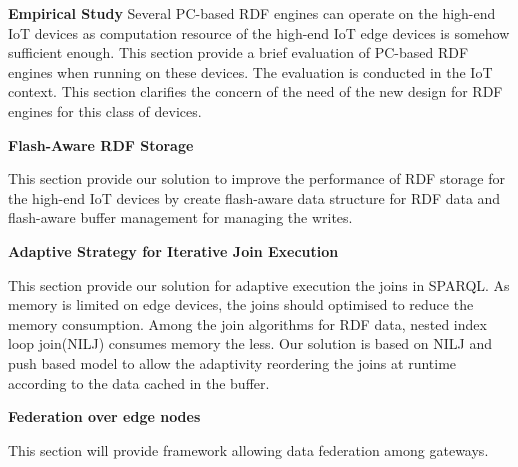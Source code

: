 \textbf{Empirical Study}
Several PC-based RDF engines can operate on the high-end IoT devices as computation resource of the high-end IoT edge devices is somehow sufficient enough.
This section provide a brief evaluation of PC-based RDF engines when running on these devices.
The evaluation is conducted in the IoT context. 
This section clarifies the concern of the need of the new design for RDF engines for this class of devices.

\textbf{Flash-Aware RDF Storage}

This section provide our solution to improve the performance of RDF storage for the high-end IoT devices by create flash-aware data structure for RDF data and flash-aware buffer management for managing the writes.

\textbf{Adaptive Strategy for Iterative Join Execution}

This section provide our solution for adaptive execution the joins in SPARQL.
As memory is limited on edge devices, the joins should optimised to reduce the memory consumption. 
Among the join algorithms for RDF data, nested index loop join(NILJ) consumes memory the less.
Our solution is based on NILJ and push based model to allow the adaptivity reordering the joins at runtime according to the data cached in the buffer. 

\textbf{Federation over edge nodes}

This section will provide framework allowing data federation among gateways.
